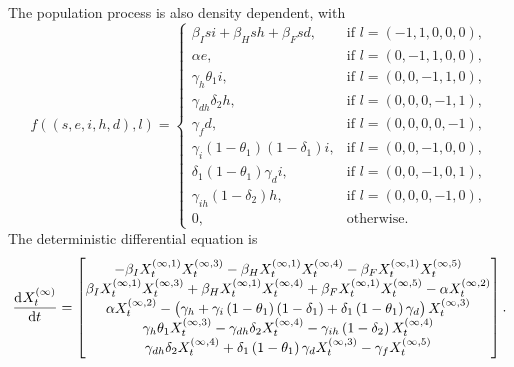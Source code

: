 The population process is also density dependent, with
\[
	f\!\left(\left(s, e, i, h, d\right), l\right) = \begin{cases}
		\beta_I s i + \beta_H sh + \beta_F sd,                        & \text{if } l = \left(-1, 1, 0, 0, 0\right), \\
		\alpha e,                                                     & \text{if } l = \left(0, -1, 1, 0, 0\right), \\
		\gamma_h \theta_1 i,                                          & \text{if } l = \left(0, 0, -1, 1, 0\right), \\
		\gamma_{dh}\delta_2 h,                                        & \text{if } l = \left(0, 0, 0, -1, 1\right), \\
		\gamma_f d,                                                   & \text{if } l = \left(0, 0, 0, 0, -1\right), \\
		\gamma_i\left(1 - \theta_1\right)\left(1 - \delta_1\right) i, & \text{if } l = \left(0,0,-1,0,0\right),     \\
		\delta_1\left(1 - \theta_1\right)\gamma_d i,                  & \text{if } l = \left(0,0,-1,0,1\right),     \\
		\gamma_{ih}\left(1 - \delta_2\right)h,                        & \text{if } l = \left(0,0,0,-1,0\right),     \\
		0,                                                            & \text{otherwise}.
	\end{cases}
\]
The deterministic differential equation is
\[
	\dod{X_t^{(\infty)}}{t} = \begin{bmatrix}
		-\beta_I X_t^{(\infty, 1)}X_t^{(\infty, 3)} - \beta_H X_t^{(\infty, 1)}X_t^{(\infty, 4)} - \beta_F X_t^{(\infty, 1)}X_t^{(\infty,5)}                                        \\
		\beta_I X_t^{(\infty, 1)}X_t^{(\infty, 3)} + \beta_H X_t^{(\infty, 1)}X_t^{(\infty, 4)} + \beta_F X_t^{(\infty, 1)}X_t^{(\infty,5)} - \alpha X_t^{(\infty, 2)}              \\
		\alpha X_t^{(\infty, 2)} - \left(\gamma_h + \gamma_i\left(1 - \theta_1\right)\left(1 - \delta_1\right) + \delta_1\left(1 - \theta_1\right)\gamma_d\right) X_t^{(\infty, 3)} \\
		\gamma_h\theta_1 X_t^{(\infty, 3)} - \gamma_{dh}\delta_2 X_t^{(\infty, 4)} - \gamma_{ih}\left(1 - \delta_2\right)X_t^{(\infty,4)}                                           \\
		\gamma_{dh}\delta_2 X_t^{(\infty, 4)} + \delta_1\left(1 - \theta_1\right)\gamma_d X_t^{(\infty, 3)} - \gamma_f X_t^{(\infty, 5)}
	\end{bmatrix}.
\]
